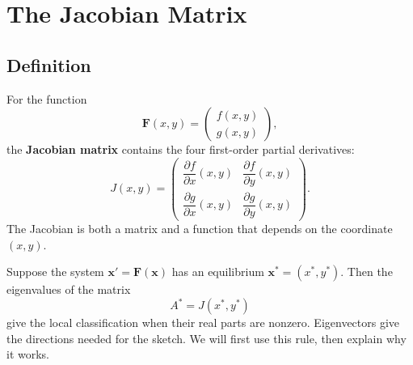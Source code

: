 \documentclass[10pt,letterpaper]{article}
\begin{document}
\section{The Jacobian Matrix}

\subsection{Definition}
For the function
$$
\textbf{F}(x,y)=\begin{pmatrix}
    f(x,y)\\
    g(x,y)
\end{pmatrix},
$$
the \textbf{Jacobian matrix} contains the four first-order partial derivatives:
\[
\boxed{
J(x,y)=
\begin{pmatrix}
\dfrac{\partial f}{\partial x}(x,y)&\dfrac{\partial f}{\partial y}(x,y)\\[6pt]
\dfrac{\partial g}{\partial x}(x,y)&\dfrac{\partial g}{\partial y}(x,y)
\end{pmatrix}.
}
\]
The Jacobian is both a matrix and a function that depends on the coordinate $(x,y)$. 

Suppose the system $\textbf{x}'=\textbf{F}(\textbf{x})$ has an equilibrium $\mathbf{x}^*=(x^*,y^*)$. Then the eigenvalues of the matrix 
$$
\boxed{A^*=J(x^*,y^*)}
$$
give the local classification when their real parts are nonzero. Eigenvectors give the directions needed for the sketch. We will first use this rule, then explain why it works.
\end{document}
